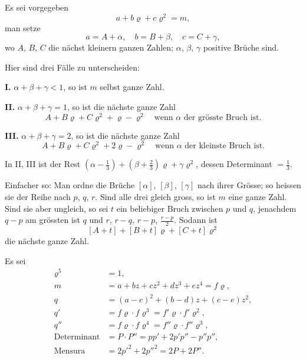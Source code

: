 \documentclass[10pt,a4paper]{article}
\begin{document}
Es sei vorgegeben
\[
a + b\varrho + c\varrho^2 = m,
\]
man setze
\[
a = A + \alpha, \quad b = B + \beta, \quad c = C + \gamma,
\]
wo $A$, $B$, $C$ die nächst kleinern ganzen Zahlen; $\alpha$, $\beta$, $\gamma$ positive Brüche sind.

Hier sind drei Fälle zu unterscheiden:

\medskip

\noindent\textbf{I.} $\alpha + \beta + \gamma < 1$, so ist $m$ selbst ganze Zahl.

\medskip

\noindent\textbf{II.} $\alpha + \beta + \gamma = 1$, so ist die nächste ganze Zahl
\[
A + B\varrho + C\varrho^2 + \varrho - \varrho^2 \quad \text{wenn $\alpha$ der grösste Bruch ist.}
\]

\medskip

\noindent\textbf{III.} $\alpha + \beta + \gamma = 2$, so ist die nächste ganze Zahl
\[
A + B\varrho + C\varrho^2 + 2\varrho - \varrho^2 \quad \text{wenn $\alpha$ der kleinste Bruch ist.}
\]

\medskip

In II, III ist der Rest $(\alpha - \frac{1}{3}) + (\beta + \frac{2}{3})\varrho + \gamma\varrho^2$, dessen Determinant $= \frac{1}{3}$.

Einfacher so: Man ordne die Brüche $[\alpha]$, $[\beta]$, $[\gamma]$ nach ihrer Grösse; so heissen sie der Reihe nach $p$, $q$, $r$. Sind alle drei gleich gross, so ist $m$ eine ganze Zahl. Sind sie aber ungleich, so sei $t$ ein beliebiger Bruch zwischen $p$ und $q$, jenachdem $q - p$ am grössten ist $q$ und $r$, $r - q$, $r - p$, $\frac{r-p}{2}$. Sodann ist
\[
[A + t] + [B + t]\varrho + [C + t]\varrho^2
\]
die nächste ganze Zahl.

\newpage
\setcounter{page}{394}

Es sei
\begin{align*}
\varrho^5 &= 1, \\
m &= a + bz + cz^2 + dz^3 + ez^4 = f\varrho, \\
q &= (a - c)^2 + (b - d)z + (c - e)z^2, \\
q' &= f\varrho \cdot f\varrho^3 = f'\varrho \cdot f'\varrho^2, \\
q'' &= f\varrho \cdot f\varrho^4 = f''\varrho \cdot f''\varrho^3, \\
\text{Determinant} &= P \cdot P'' = pp' + 2p'p'' - p''p'', \\
\text{Mensura} &= 2p'^2 + 2p''^2 = 2P + 2P''.
\end{align*}
\end{document}
